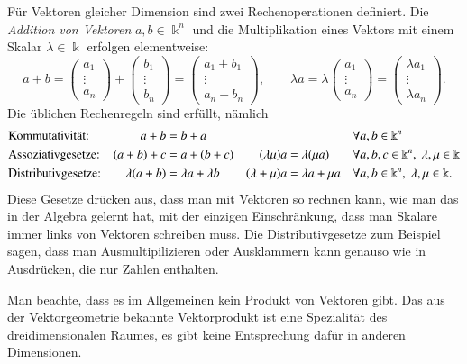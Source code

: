 Für Vektoren gleicher Dimension sind zwei Rechenoperationen definiert.
Die {\em Addition von Vektoren} $a,b\in\Bbbk^n$  und die Multiplikation
%
eines Vektors mit einem Skalar $\lambda\in\Bbbk$ erfolgen elementweise:
\[
a+b
=
\begin{pmatrix}a_1\\\vdots\\a_n\end{pmatrix}
+
\begin{pmatrix}b_1\\\vdots\\b_n\end{pmatrix}
=
\begin{pmatrix}a_1+b_1\\\vdots\\a_n+b_n\end{pmatrix},
\qquad
\lambda a
=
\lambda
\begin{pmatrix}a_1\\\vdots\\a_n\end{pmatrix}
=
\begin{pmatrix}\lambda a_1\\\vdots\\\lambda a_n\end{pmatrix}.
\]
Die üblichen Rechenregeln sind erfüllt, nämlich
\begin{equation}
\index{Kommutativgesetz}%
\index{Assoziativgesetz}%
\index{Distributivgesetz}%
\begin{aligned}
&\text{Kommutativität:}
&
a+b&=b+a
&&
&&\forall a,b\in \Bbbk^n
\\
&\text{Assoziativgesetze:}
&
(a+b)+c&=a+(b+c)
&
(\lambda\mu)a&=\lambda(\mu a)
&&\forall a,b,c\in \Bbbk^n,\; \lambda,\mu\in\Bbbk
\\
&\text{Distributivgesetze:}
&
\lambda(a+b)&=\lambda a + \lambda b
&
(\lambda+\mu)a&=\lambda a + \mu a
&&\forall a,b\in \Bbbk^n,\; \lambda,\mu\in\Bbbk.
\end{aligned}
\label{buch:vektoren-und-matrizen:eqn:vrgesetze}
\end{equation}
Diese Gesetze drücken aus, dass man mit Vektoren so rechnen kann, wie man
das in der Algebra gelernt hat, mit der einzigen Einschränkung, dass
man Skalare immer links von Vektoren schreiben muss.
Die Distributivgesetze zum Beispiel sagen, dass man Ausmultipilizieren
oder Ausklammern kann genauso wie in Ausdrücken, die nur Zahlen enthalten.

Man beachte, dass es im Allgemeinen kein Produkt von Vektoren gibt.
Das aus der Vektorgeometrie bekannte Vektorprodukt ist eine Spezialität
des dreidimensionalen Raumes, es gibt keine Entsprechung dafür in anderen
Dimensionen.

